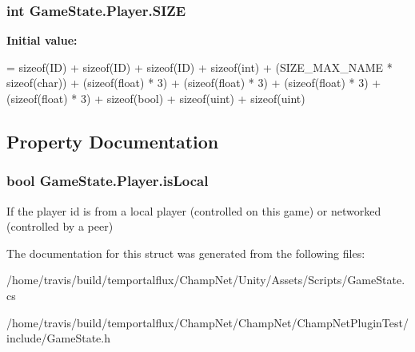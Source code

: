 \hypertarget{struct_game_state_1_1_player_ada2d068d3d5f973f73abac805c162d17}{
\subsubsection[{S\-I\-Z\-E}]{\setlength{\rightskip}{0pt plus 5cm}int Game\-State.\-Player.\-S\-I\-Z\-E\hspace{0.3cm}{\ttfamily [static]}}}\label{struct_game_state_1_1_player_ada2d068d3d5f973f73abac805c162d17}
{\bfseries Initial value\-:}
\begin{DoxyCode}
=
            \textcolor{keyword}{sizeof}(ID) 
            + \textcolor{keyword}{sizeof}(ID) 
            + \textcolor{keyword}{sizeof}(ID) 
            + \textcolor{keyword}{sizeof}(\textcolor{keywordtype}{int}) + (SIZE\_MAX\_NAME * \textcolor{keyword}{sizeof}(char))
            + (\textcolor{keyword}{sizeof}(float) * 3) 
            + (\textcolor{keyword}{sizeof}(float) * 3) 
            + (\textcolor{keyword}{sizeof}(float) * 3) 
            + (\textcolor{keyword}{sizeof}(float) * 3) 
            + \textcolor{keyword}{sizeof}(bool) 
            + \textcolor{keyword}{sizeof}(uint) 
            + \textcolor{keyword}{sizeof}(uint)
\end{DoxyCode}


\subsection{Property Documentation}
\hypertarget{struct_game_state_1_1_player_affd7c601a6d763dafdc59a58c415e9e7}{
\subsubsection[{is\-Local}]{\setlength{\rightskip}{0pt plus 5cm}bool Game\-State.\-Player.\-is\-Local\hspace{0.3cm}{\ttfamily [get]}}}\label{struct_game_state_1_1_player_affd7c601a6d763dafdc59a58c415e9e7}


If the player id is from a local player (controlled on this game) or networked (controlled by a peer) 



The documentation for this struct was generated from the following files\-:\begin{DoxyCompactItemize}
\item 
/home/travis/build/temportalflux/\-Champ\-Net/\-Unity/\-Assets/\-Scripts/Game\-State.\-cs\item 
/home/travis/build/temportalflux/\-Champ\-Net/\-Champ\-Net/\-Champ\-Net\-Plugin\-Test/include/Game\-State.\-h\end{DoxyCompactItemize}
